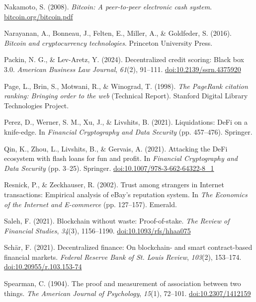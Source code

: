 \begin{enumerate}[label={[\arabic*]}, leftmargin=*, itemsep=0.35em, parsep=0pt]
  \item{}\label{ref:46} Nakamoto, S. (2008). \textit{Bitcoin: A peer-to-peer electronic cash system}. \href{https://bitcoin.org/bitcoin.pdf}{bitcoin.org/bitcoin.pdf}
  \item{}\label{ref:47} Narayanan, A., Bonneau, J., Felten, E., Miller, A., \& Goldfeder, S. (2016). \textit{Bitcoin and cryptocurrency technologies}. Princeton University Press.
  \item{}\label{ref:48} Packin, N. G., \& Lev-Aretz, Y. (2024). Decentralized credit scoring: Black box 3.0. \textit{American Business Law Journal}, \textit{61}(2), 91--111. \href{https://doi.org/10.2139/ssrn.4375920}{doi:10.2139/ssrn.4375920}
  \item{}\label{ref:49} Page, L., Brin, S., Motwani, R., \& Winograd, T. (1998). \textit{The PageRank citation ranking: Bringing order to the web} (Technical Report). Stanford Digital Library Technologies Project.
  \item{}\label{ref:50} Perez, D., Werner, S. M., Xu, J., \& Livshits, B. (2021). Liquidations: DeFi on a knife-edge. In \textit{Financial Cryptography and Data Security} (pp. 457--476). Springer.
  \item{}\label{ref:51} Qin, K., Zhou, L., Livshits, B., \& Gervais, A. (2021). Attacking the DeFi ecosystem with flash loans for fun and profit. In \textit{Financial Cryptography and Data Security} (pp. 3--25). Springer. \href{https://doi.org/10.1007/978-3-662-64322-8_1}{doi:10.1007/978-3-662-64322-8\_1}
  \item{}\label{ref:52} Resnick, P., \& Zeckhauser, R. (2002). Trust among strangers in Internet transactions: Empirical analysis of eBay's reputation system. In \textit{The Economics of the Internet and E-commerce} (pp. 127--157). Emerald.
  \item{}\label{ref:53} Saleh, F. (2021). Blockchain without waste: Proof-of-stake. \textit{The Review of Financial Studies}, \textit{34}(3), 1156--1190. \href{https://doi.org/10.1093/rfs/hhaa075}{doi:10.1093/rfs/hhaa075}
  \item{}\label{ref:54} Sch\"{a}r, F. (2021). Decentralized finance: On blockchain- and smart contract-based financial markets. \textit{Federal Reserve Bank of St. Louis Review}, \textit{103}(2), 153--174. \href{https://doi.org/10.20955/r.103.153-74}{doi:10.20955/r.103.153-74}
  \item{}\label{ref:55} Spearman, C. (1904). The proof and measurement of association between two things. \textit{The American Journal of Psychology}, \textit{15}(1), 72--101. \href{https://doi.org/10.2307/1412159}{doi:10.2307/1412159}

\end{enumerate}
